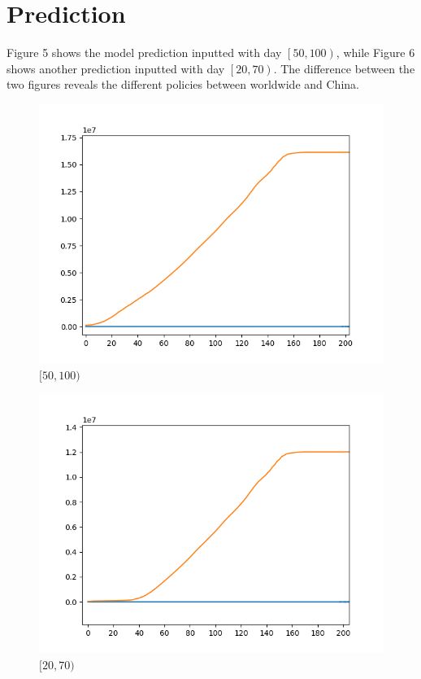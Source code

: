 \documentclass[]{article}
\begin{document}
\section{Prediction}
Figure 5 shows the model prediction inputted with day $\left[ 50, 100 \right)$, while Figure 6 shows another prediction inputted with day $\left[ 20, 70 \right)$. The difference between the two figures reveals the different policies between worldwide and China.
\begin{figure}[H]
	\centering
	\includegraphics[width=0.7\linewidth]{Figure_1}
	\caption{$[50, 100)$}
	\label{fig:figure1}
\end{figure}
\begin{figure}[H]
	\centering
	\includegraphics[width=0.7\linewidth]{Figure_2}
	\caption{$[20, 70)$}
	\label{fig:figure2}
\end{figure}
\end{document}
